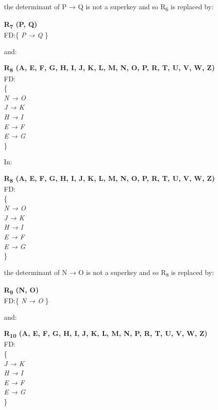 the determinant of P → Q is not a superkey and so R\textsubscript{6} is replaced by:\\

\begin{adjustwidth}{2cm}{}
\textbf{R\textsubscript{7} (P, Q)}\\
FD:\{
\textit{ 
P → Q 
}
\} \\
\end{adjustwidth} 

and:\\

\begin{adjustwidth}{2cm}{}
\textbf{R\textsubscript{8} (A, E, F, G, H, I, J, K, L, M, N, O, P, R, T, U, V, W, Z)}\\
FD:\\
\{\\
\textit{ 
N → O\\
J → K\\
H → I\\
E → F\\
E → G\\
}
\} \\
\end{adjustwidth}

In:\\

\begin{adjustwidth}{2cm}{}
\textbf{R\textsubscript{8} (A, E, F, G, H, I, J, K, L, M, N, O, P, R, T, U, V, W, Z)}\\
FD:\\
\{\\
\textit{ 
N → O\\
J → K\\
H → I\\
E → F\\
E → G\\
}
\} \\
\end{adjustwidth}

the determinant of N → O is not a superkey and so R\textsubscript{8} is replaced by:\\

\begin{adjustwidth}{2cm}{}
\textbf{R\textsubscript{9} (N, O)}\\
FD:\{
\textit{ 
N → O 
}
\} \\
\end{adjustwidth} 

and:\\

\begin{adjustwidth}{2cm}{}
\textbf{R\textsubscript{10} (A, E, F, G, H, I, J, K, L, M, N, P, R, T, U, V, W, Z)}\\
FD:\\
\{\\
\textit{ 
J → K\\
H → I\\
E → F\\
E → G\\
}
\} \\
\end{adjustwidth} 

